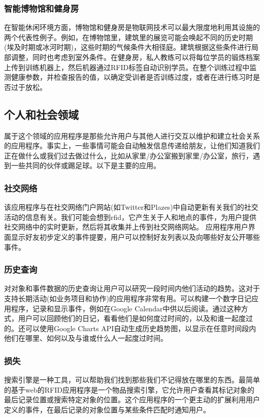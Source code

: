 \documentclass[12pt,a4paper]{article}%
\begin{document}
\subsubsection{智能博物馆和健身房}
在智能休闲环境方面，博物馆和健身房是物联网技术可以最大限度地利用其设施的两个代表性例子。例如，在博物馆里，建筑里的展览可能会唤起不同的历史时期(埃及时期或冰河时期)，这些时期的气候条件大相径庭。建筑根据这些条件进行局部调整，同时也考虑到室外条件。在健身房，私人教练可以将每位学员的锻炼档案上传到训练机器上，然后机器通过RFID标签自动识别学员。在整个训练过程中监测健康参数，并检查报告的值，以确定受训者是否训练过度，或者在进行练习时是否过于放松。
\subsection{个人和社会领域}
属于这个领域的应用程序是那些允许用户与其他人进行交互以维护和建立社会关系的应用程序。事实上，一些事情可能会自动触发信息传递给朋友，让他们知道我们正在做什么或我们过去做过什么，比如从家里/办公室搬到家里/办公室，旅行，遇到一些共同的伙伴或踢足球。以下是主要的应用。
\subsubsection{社交网络}
该应用程序与在社交网络门户网站(如Twitter和Plazes)中自动更新有关我们的社交活动的信息有关。我们可能会想到rfid，它产生关于人和地点的事件，为用户提供社交网络中的实时更新，然后将其收集并上传到社交网络网站。
应用程序用户界面显示好友初步定义的事件提要，用户可以控制好友列表以及向哪些好友公开哪些事件。
\subsubsection{历史查询}
对对象和事件数据的历史查询让用户可以研究一段时间内他们活动的趋势。这对于支持长期活动(如业务项目和协作)的应用程序非常有用。可以构建一个数字日记应用程序，记录和显示事件，例如在Google Calendar中供以后阅读。通过这种方式，用户可以回顾他们的日记，看看他们是如何度过时间的，以及和谁一起度过的。还可以使用Google Charts API自动生成历史趋势图，以显示在任意时间段内他们在哪里、如何以及与谁或什么人一起度过时间。
\subsubsection{损失}
搜索引擎是一种工具，可以帮助我们找到那些我们不记得放在哪里的东西。最简单的基于web的RFID应用程序是一个物品搜索引擎，它允许用户查看其标记对象的最后记录位置或搜索特定对象的位置。这个应用程序的一个更主动的扩展利用用户定义的事件，在最后记录的对象位置与某些条件匹配时通知用户。
\end{document}
